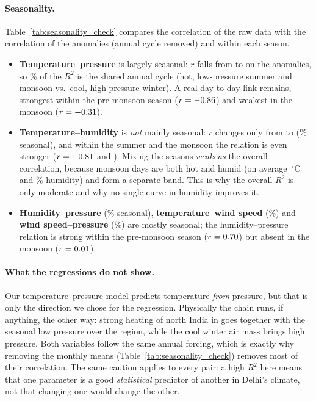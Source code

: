 \documentclass[11pt,a4paper]{article}
\newcommand{\Rsq}{R^2}
\newcommand{\tabinput}[1]{}
\begin{document}
\tabinput{robustness_check}

\paragraph{Seasonality.} Table~\ref{tab:seasonality_check} compares the correlation of
the raw data with the correlation of the anomalies (annual cycle removed) and within
each season.
\begin{itemize}
  \item \textbf{Temperature--pressure} is largely seasonal: $r$ falls from \rTP{} to \ranomTP{}
        on the anomalies, so \seasShareTP\% of the $\Rsq$ is the shared annual cycle (hot,
        low-pressure summer and monsoon vs.\ cool, high-pressure winter). A real
        day-to-day link remains, strongest within the pre-monsoon season ($r=-0.86$)
        and weakest in the monsoon ($r=-0.31$).
  \item \textbf{Temperature--humidity} is \emph{not} mainly seasonal: $r$ changes only from
        \rTH{} to \ranomTH{} (\seasShareTH\% seasonal), and within the summer and the
        monsoon the relation is even stronger ($r=-0.81$ and \rMonsoonTH). Mixing the
        seasons \emph{weakens} the overall correlation, because monsoon days are both hot
        and humid (on average \monsoonTemp\,$^\circ$C and \monsoonHum\% humidity) and form
        a separate band. This is why the overall $\Rsq$ is only moderate and why no single
        curve in humidity improves it.
  \item \textbf{Humidity--pressure} (\seasShareHP\% seasonal), \textbf{temperature--wind speed}
        (\seasShareTW\%) and \textbf{wind speed--pressure} (\seasShareWP\%) are mostly
        seasonal; the humidity--pressure relation is strong within the pre-monsoon season
        ($r=0.70$) but absent in the monsoon ($r=0.01$).
\end{itemize}

\tabinput{seasonality_check}

\paragraph{What the regressions do not show.} Our temperature--pressure model predicts
temperature \emph{from} pressure, but that is only the direction we chose for the
regression. Physically the chain runs, if anything, the other way: strong heating of
north India in \hotMonth{} goes together with the seasonal low pressure over the region,
while the cool winter air mass brings high pressure. Both variables follow the
same annual forcing, which is exactly why removing the monthly means
(Table~\ref{tab:seasonality_check}) removes most of their correlation. The same caution
applies to every pair: a high $\Rsq$ here means that one parameter is a good
\emph{statistical} predictor of another in Delhi's climate, not that changing one
would change the other.
\end{document}
